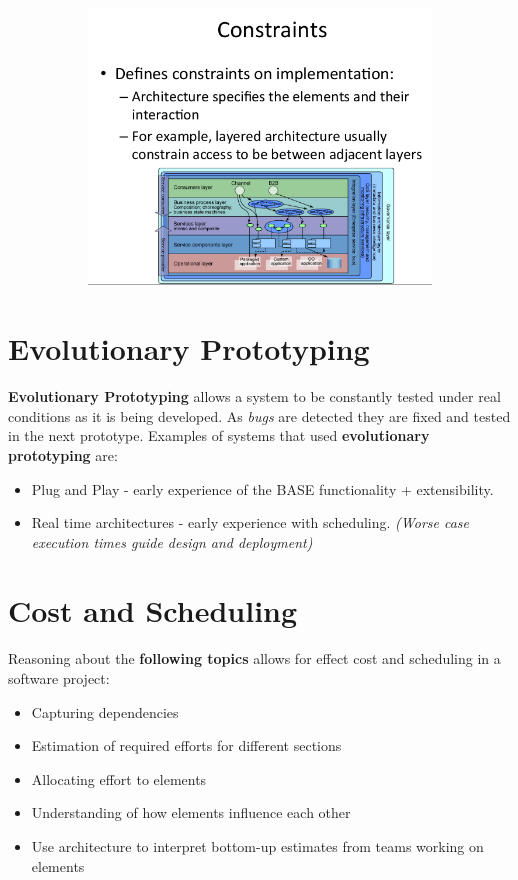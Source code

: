 \documentclass[a4paper]{report}
\begin{document}
\begin{figure}[H]
\hskip-1.5cm\begin{subfigure}{1.1\textwidth}
  \includegraphics[width=1.2\linewidth]
  {images/2-constraints.png}
\end{subfigure}
\end{figure}

\section{Evolutionary Prototyping}
\textbf{Evolutionary Prototyping} allows a system to be constantly tested under real conditions as it is being developed. As \textit{bugs} are detected they are fixed and tested in the next prototype. Examples of systems that used \textbf{evolutionary prototyping} are:
\begin{itemize}
\item Plug and Play - early experience of the BASE functionality + extensibility.
\item Real time architectures - early experience with scheduling. \textit{(Worse case execution times guide design and deployment)}
\end{itemize}

\section{Cost and Scheduling}
Reasoning about the \textbf{following topics} allows for effect cost and scheduling in a software project:
\begin{itemize}
\item Capturing dependencies
\item Estimation of required efforts for different sections
\item Allocating effort to elements
\item Understanding of how elements influence each other
\item Use architecture to interpret bottom-up estimates from teams working on elements
\end{itemize}
\end{document}
